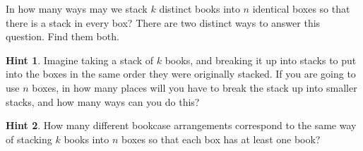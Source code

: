 \documentclass{book}
\begin{document}
\setcounter{cpjt}{131}
\addtocounter{cpjt}{-1}
\begin{activity}\label{brokenpermutation}
\hypertarget{p-872}{}%
In how many ways may we stack \(k\) distinct books into \(n\) identical boxes so that there is a stack in every box? There are two distinct ways to answer this question.  Find them both.%
\par\smallskip%
\noindent\textbf{Hint 1}.\hypertarget{hint-88}{}\quad%
\hypertarget{p-873}{}%
Imagine taking a stack of \(k\) books, and breaking it up into stacks to put into the boxes in the same order they were originally stacked. If you are going to use \(n\) boxes, in how many places will you have to break the stack up into smaller stacks, and how many ways can you do this?%
\par\smallskip%
\noindent\textbf{Hint 2}.\hypertarget{hint-89}{}\quad%
\hypertarget{p-874}{}%
How many different bookcase arrangements correspond to the same way of stacking \(k\) books into \(n\) boxes so that each box has at least one book?%
\par\smallskip%
\noindent\end{activity}

\clearpage
\end{document}
